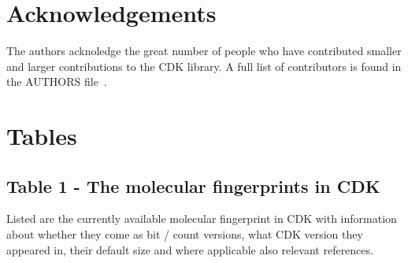 \documentclass[10pt]{bmc_article}
\newenvironment{bmcformat}{\begin{raggedright}\baselineskip20pt\sloppy\setboolean{publ}{false}}{\end{raggedright}\baselineskip20pt\sloppy}
\begin{document}
\begin{bmcformat}
    

\section*{Acknowledgements}
The authors acknoledge the great number of people who have contributed smaller
and larger contributions to the CDK library. A full list of contributors is
found in the AUTHORS file~\cite{AUTHORS}.


{
  
}





%


\newpage


\section*{Tables}
  \subsection*{Table 1 - The molecular fingerprints in CDK}
  Listed are the currently available molecular fingerprint in CDK with
  information about whether they come as bit / count versions, what CDK version
  they appeared in, their default size and where applicable also relevant
  references.
  \baselineskip


\end{bmcformat}
\end{document}
